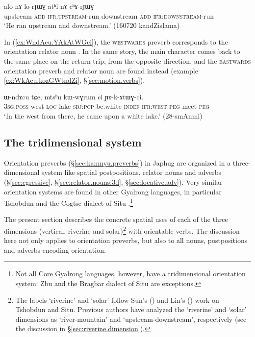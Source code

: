 \begin{exe}
	\ex \label{ex:alo.lorJWG.athi.chArJWG}
	\gll alo nɤ lo-rɟɯɣ atʰi nɤ cʰɤ-rɟɯɣ \\
	upstream \textsc{add} \textsc{ifr}:\textsc{upstream}-run 	downstream \textsc{add} \textsc{ifr}:\textsc{downstream}-run  \\
	\glt `He ran upstream and downstream.' (160720 kandZislama)
\end{exe}

In (\ref{ex:WndAcu.YAkAtWGci}), the \textsc{westwards}  preverb corresponds to the orientation relator noun . In the same story, the main character comes back to the same place on the return trip, from the opposite direction, and the \textsc{eastwards} orientation preverb and relator noun are found instead (example \ref{ex:WkAcu.kozGWtndZi}, §\ref{sec:motion.verbs}).


\begin{exe}
	\ex \label{ex:WndAcu.YAkAtWGci}
	\gll ɯ-ndɤcu tɕe, mtsʰu kɯ-wɣrum ci ɲɤ-k-ɤtɯɣ-ci. \\
	\textsc{3sg}.\textsc{poss}-west \textsc{loc} lake \textsc{sbj}:\textsc{pcp}-be.white \textsc{indef} \textsc{ifr}:\textsc{west}-\textsc{peg}-meet-\textsc{peg} \\
	\glt `In the west from there, he came upon a white lake.' (28-smAnmi) 
\end{exe}

 
\subsection{The tridimensional system} \label{sec:tridimensional.preverb}
Orientation preverbs (§\ref{sec:kamnyu.preverbs}) in Japhug are organized in a three-dimensional system like spatial postpositions, relator nouns and adverbs (§\ref{sec:egressive}, §\ref{sec:relator.nouns.3d}, §\ref{sec:locative.adv}). Very similar orientation systems are found in other Gyalrong languages, in particular Tshobdun \citep{jackson00sidaba} and the Cogtse dialect of Situ \citep{linxr93jiarong, lin02dimension, linyj17space}.\footnote{Not all Core Gyalrong languages, however, have a tridimensional orientation system: Zbu \citep{gong18these} and the Bragbar dialect of Situ \citep{zhangshuya20these} are exceptions.} 

The present section describes the concrete spatial uses of each of the three dimensions (vertical, riverine and solar)\footnote{The labels `riverine' and `solar' follow  Sun's (\citeyear{jackson00sidaba}) and Lin's (\citeyear{lin02dimension}) work on Tshobdun and Situ. Previous authors \citep{linxr93jiarong} have analyzed the `riverine' and `solar' dimensions as `river-mountain' and `upstream-downstream', respectively (see the discussion in §\ref{sec:riverine.dimension}).  } with orientable verbs. The discussion here not only applies to orientation preverbs, but also to all nouns, postpositions and adverbs encoding orientation.

